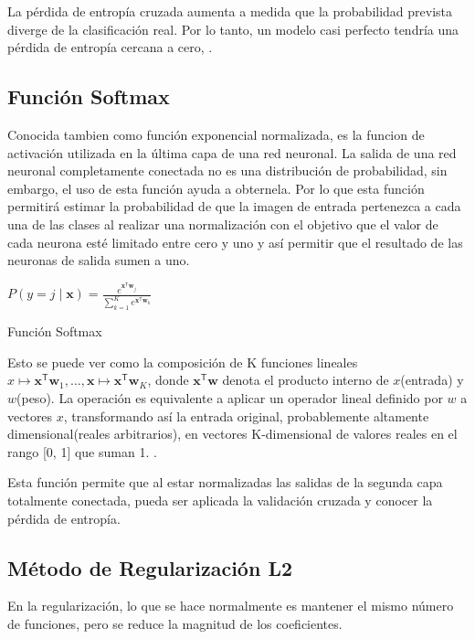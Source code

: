 		La pérdida de entropía cruzada aumenta a medida que la probabilidad prevista diverge de la clasificación real. Por lo tanto, un modelo casi perfecto tendría una pérdida de entropía cercana a cero, \citep{crossMSE}.
		


	\subsection{Función Softmax}
		Conocida tambien como función exponencial normalizada, es la funcion de activación utilizada en la última capa de una red neuronal. La salida de una red neuronal completamente conectada no es una distribución de probabilidad, sin embargo, el uso de esta función ayuda a obternela. Por lo que esta función permitirá estimar la probabilidad de que la imagen de entrada pertenezca a cada una de las clases al realizar una normalización con el objetivo que el valor de cada neurona esté limitado entre cero y uno y así permitir que el resultado de las neuronas de salida sumen a uno. 

			\begingroup\makeatletter{}\check@mathfonts
			\begin{center}
			${\displaystyle P(y=j\mid \mathbf {x} )={\frac {e^{\mathbf {x} ^{\mathsf {T}}\mathbf {w} _{j}}}{\sum _{k=1}^{K}e^{\mathbf {x} ^{\mathsf {T}}\mathbf {w} _{k}}}}}$
			\end{center}
			\begin{center}
			{\small{Función Softmax}}
			\end{center}
			\endgroup
			
		Esto se puede ver como la composición de K funciones lineales ${x} \mapsto \mathbf {x} ^{\mathsf {T}}\mathbf {w} _{1},\ldots ,\mathbf {x} \mapsto \mathbf {x} ^{\mathsf {T}}\mathbf {w} _{K}$, donde ${\mathbf {x} ^{\mathsf {T}}\mathbf {w}}$ denota el producto interno de $x$(entrada) y $w$(peso).	La operación es equivalente a aplicar un operador lineal definido por $ w $ a vectores $ x $, transformando así la entrada original, probablemente altamente dimensional(reales arbitrarios), en vectores K-dimensional de valores reales en el rango [0, 1] que suman 1. \citep{Bishop}. 

		Esta función permite que al estar normalizadas las salidas de la segunda capa totalmente conectada, pueda ser aplicada la validación cruzada y conocer la pérdida de entropía.

	
	\subsection{Método de Regularización L2}
		En la regularización, lo que se hace normalmente es mantener el mismo número de funciones, pero se reduce la magnitud de los coeficientes.

